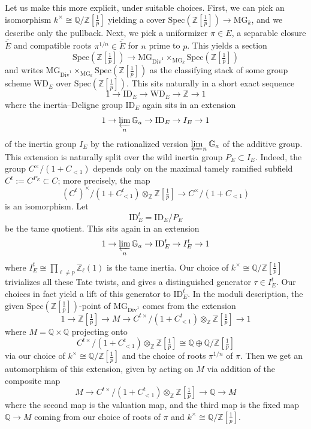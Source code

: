 \documentclass[11pt]{amsart}
\numberwithin{equation}{section}
\numberwithin{theorem}{section}
\theoremstyle{definition}
\newcommand{\Div}{\mathrm{Div}}
\begin{document}
Let us make this more explicit, under suitable choices. First, we can pick an isomorphism $k^\times\cong \mathbb Q/\mathbb Z[\tfrac 1p]$ yielding a cover $\mathrm{Spec}(\mathbb Z[\tfrac 1p])\to \mathrm{MG}_k$, and we describe only the pullback. Next, we pick a uniformizer $\pi\in E$, a separable closure $\overline{\breve{E}}$ and compatible roots $\pi^{1/n}\in \overline{\breve{E}}$ for $n$ prime to $p$. This yields a section
\[
\mathrm{Spec}(\mathbb Z[\tfrac 1p])\to \mathrm{MG}_{\Div^1}\times_{\mathrm{MG}_k} \mathrm{Spec}(\mathbb Z[\tfrac 1p])
\]
and writes $\mathrm{MG}_{\Div^1}\times_{\mathrm{MG}_k} \mathrm{Spec}(\mathbb Z[\tfrac 1p])$ as the classifying stack of some group scheme $\mathrm{WD}_E$ over $\mathrm{Spec}(\mathbb Z[\tfrac 1p])$. This sits naturally in a short exact sequence
\[
1\to \mathrm{ID}_E\to \mathrm{WD}_E\to \mathbb Z\to 1
\]
where the inertia--Deligne group $\mathrm{ID}_E$ again sits in an extension
\[
1\to \varprojlim_n \mathbb G_a\to \mathrm{ID}_E\to I_E\to 1
\]
of the inertia group $I_E$ by the rationalized version $\varprojlim_n \mathbb G_a$ of the additive group. This extension is naturally split over the wild inertia group $P_E\subset I_E$. Indeed, the group $C^\times/(1+C_{<1})$ depends only on the maximal tamely ramified subfield $C^t := C^{P_E}\subset C$; more precisely, the map
\[
(C^t)^\times/(1+C^t_{<1})\otimes_{\mathbb Z} \mathbb Z[\tfrac 1p]\to C^\times/(1+C_{<1})
\]
is an isomorphism. Let
\[
\mathrm{ID}_E^t = \mathrm{ID}_E/P_E
\]
be the tame quotient. This sits again in an extension
\[
1\to \varprojlim_n \mathbb G_a\to \mathrm{ID}_E^t\to I_E^t\to 1
\]
where $I_E^t\cong \prod_{\ell\neq p}\mathbb Z_\ell(1)$ is the tame inertia. Our choice of $k^\times\cong \mathbb Q/\mathbb Z[\tfrac 1p]$ trivializes all these Tate twists, and gives a distinguished generator $\tau\in I_E^t$. Our choices in fact yield a lift of this generator to $\mathrm{ID}_E^t$. In the moduli description, the given $\mathrm{Spec}(\mathbb Z[\tfrac 1p])$-point of $\mathrm{MG}_{\mathrm{Div}^1}$ comes from the extension
\[
1\to \mathbb Z[\tfrac 1p]\to M\to C^{t\times}/(1+C^t_{<1})\otimes_{\mathbb Z} \mathbb Z[\tfrac 1p]\to 1
\]
where $M=\mathbb Q\times\mathbb Q$ projecting onto
\[
C^{t\times}/(1+C^t_{<1})\otimes_{\mathbb Z} \mathbb Z[\tfrac 1p]\cong \mathbb Q\oplus \mathbb Q/\mathbb Z[\tfrac 1p]
\]
via our choice of $k^\times\cong \mathbb Q/\mathbb Z[\tfrac 1p]$ and the choice of roots $\pi^{1/n}$ of $\pi$. Then we get an automorphism of this extension, given by acting on $M$ via addition of the composite map
\[
M\to C^{t\times}/(1+C^t_{<1})\otimes_{\mathbb Z} \mathbb Z[\tfrac 1p]\to \mathbb Q\to M
\]
where the second map is the valuation map, and the third map is the fixed map $\mathbb Q\to M$ coming from our choice of roots of $\pi$ and $k^\times\cong \mathbb Q/\mathbb Z[\tfrac 1p]$.
\end{document}
